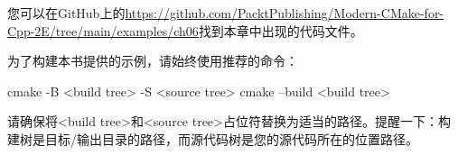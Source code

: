 
您可以在GitHub上的\url{https://github.com/PacktPublishing/Modern-CMake-for-Cpp-2E/tree/main/examples/ch06}找到本章中出现的代码文件。

为了构建本书提供的示例，请始终使用推荐的命令：

\begin{shell}
cmake -B <build tree> -S <source tree>
cmake --build <build tree>
\end{shell}

请确保将<build tree>和<source tree>占位符替换为适当的路径。提醒一下：构建树是目标/输出目录的路径，而源代码树是您的源代码所在的位置路径。
